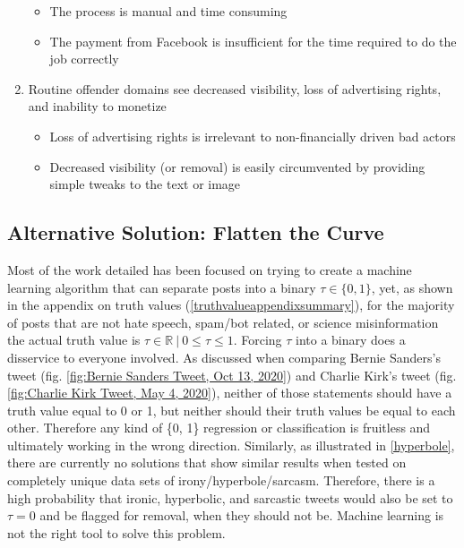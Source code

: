 \documentclass[preprint,review,12pt]{elsarticle}
\begin{document}
\begin{enumerate}
     \begin{itemize}
         \item The process is manual and time consuming
         \item The payment from Facebook is insufficient for the time required to do the job correctly
     \end{itemize}
     \item Routine offender domains see decreased visibility, loss of advertising rights, and inability to monetize
     \begin{itemize}
         \item Loss of advertising rights is irrelevant to non-financially driven bad actors
         \item Decreased visibility (or removal) is easily circumvented by providing simple tweaks to the text or image
     \end{itemize}
 \end{enumerate}
 
\subsection{Alternative Solution: Flatten the Curve}
\label{Flatten the Curve Section}
 Most of the work detailed has been focused on trying to create a machine learning algorithm that can separate posts into a binary $\tau \in \{0,1\}$, yet, as shown in the appendix on truth values (\ref{truthvalueappendixsummary}), for the majority of posts that are not hate speech, spam/bot related, or science misinformation the actual truth value is $\tau \in \mathbb{R} \ | \ 0 \leq \tau \leq 1$. Forcing $\tau$ into a binary does a disservice to everyone involved. As discussed when comparing Bernie Sanders's tweet (fig. \ref{fig:Bernie Sanders Tweet, Oct 13, 2020}) and  Charlie Kirk's tweet (fig. \ref{fig:Charlie Kirk Tweet, May 4, 2020}), neither of those statements should have a truth value equal to 0 or 1, but neither should their truth values be equal to each other. Therefore any kind of \{0, 1\} regression or classification is fruitless and ultimately working in the wrong direction. Similarly, as illustrated in \ref{hyperbole}, there are currently no solutions that show similar results when tested on completely unique data sets of irony/hyperbole/sarcasm. Therefore, there is a high probability that ironic, hyperbolic, and sarcastic tweets would also be set to $\tau = 0$ and be flagged for removal, when they should not be. Machine learning is not the right tool to solve this problem. 
 
\end{document}
